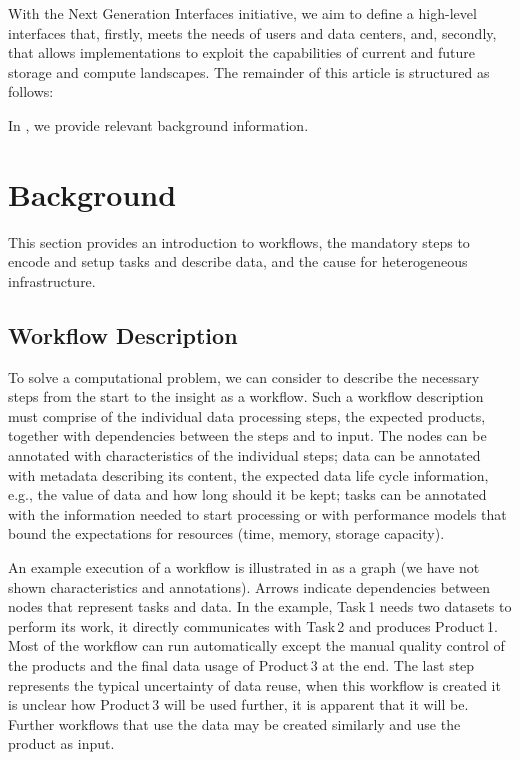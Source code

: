\documentclass[a4paper, twocolumn]{article}
\begin{document}
\medskip

With the Next Generation Interfaces initiative, we aim to define a high-level interfaces that, firstly, meets the needs of users and data centers, and, secondly, that allows implementations to exploit the capabilities of current and future storage and compute landscapes.
The remainder of this article is structured as follows: \\

In , we provide relevant background information.


\section{Background}
\label{sec:background}
This section provides an introduction to workflows, the mandatory steps to encode and setup tasks and describe data, and the cause for heterogeneous infrastructure.


\subsection{Workflow Description}

To solve a computational problem, we can consider to describe the necessary steps from the start to the insight as a workflow.
Such a workflow description must comprise of the individual data processing steps, the expected  products, together with dependencies between the steps and to input.
The nodes can be annotated with characteristics of the individual steps;
data can be annotated with metadata describing its content, the expected data life cycle information, e.g., the value of data and how long should it be kept; tasks can be annotated with the information needed to start processing or with performance models that bound the  expectations for resources (time, memory, storage capacity).

An example execution of a workflow is illustrated in  as a graph (we have not shown characteristics and annotations).
Arrows indicate dependencies between nodes that represent tasks and data.
In the example, Task\,1 needs two datasets to perform its work, it directly communicates with Task\,2 and produces Product\,1.
Most of the workflow can run automatically except the manual quality control of the products and the final data usage of Product\,3 at the end.
The last step represents the typical uncertainty of data reuse, when this workflow is created it is unclear how Product\,3 will be used further, it is apparent that it will be.
Further workflows that use the data may be created similarly and use the product as input.
\end{document}
